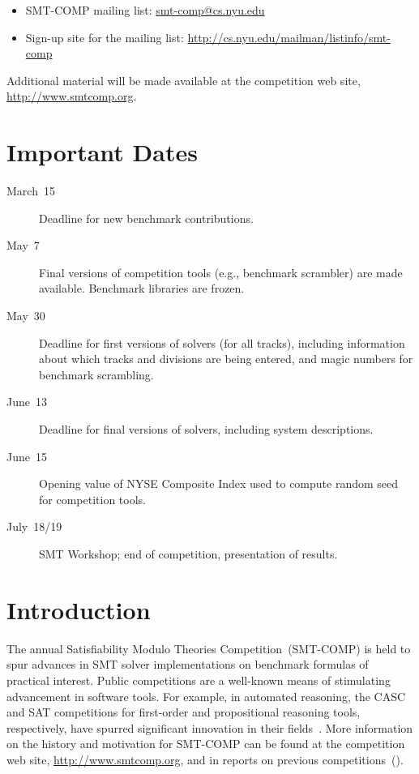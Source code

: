 \documentclass[12pt]{article}
\begin{document}
\begin{itemize}
\item SMT-COMP mailing list:
  \href{mailto:smt-comp@cs.nyu.edu}{\textrm{smt-comp@cs.nyu.edu}}
\item Sign-up site for the mailing list:
  \url{http://cs.nyu.edu/mailman/listinfo/smt-comp}
\end{itemize}

\noindent Additional material will be made available at the
competition web site, \url{http://www.smtcomp.org}.


\newpage

\section{Important Dates}
\label{sec:important}

\begin{description}
\item[March~15] Deadline for new benchmark contributions.
\item[May~7] Final versions of competition tools (e.g., benchmark
  scrambler) are made available.  Benchmark libraries are frozen.
\item[May~30] Deadline for first versions of solvers (for all tracks),
  including information about which tracks and divisions are being
  entered, and magic numbers for benchmark scrambling.
\item[June~13] Deadline for final versions of solvers, including
  system descriptions.
\item[June~15] Opening value of NYSE Composite Index used to compute
  random seed for competition tools.
\item[July~18/19] SMT Workshop; end of competition, presentation of
  results.
\end{description}


\section{Introduction}

The annual Satisfiability Modulo Theories Competition~(SMT-COMP) is
held to spur advances in SMT solver implementations on benchmark
formulas of practical interest.  Public competitions are a well-known
means of stimulating advancement in software tools.  For example, in
automated reasoning, the CASC and SAT competitions for first-order and
propositional reasoning tools, respectively, have spurred significant
innovation in their fields~\cite{leberre+03,PSS02}.  More information
on the history and motivation for SMT-COMP can be found at the
competition web site, \url{http://www.smtcomp.org}, and in reports on
previous
competitions~(\cite{SMTCOMP-JAR,SMTCOMP-FMSD,BDOS08,SMTCOMP-2008,CDW14,SMTCOMP-2012,CSW15}).
\end{document}
